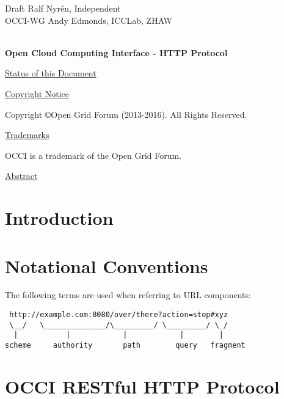 \documentclass[10pt,a4paper]{article}
\begin{document}
\thispagestyle{empty}

Draft \hfill Ralf Nyrén, Independent \\
OCCI-WG \hfill Andy Edmonds, ICCLab, ZHAW \\
\\

\vspace*{0.5in}

\begin{Large}
\textbf{Open Cloud Computing Interface - HTTP Protocol}
\end{Large}

\vspace*{0.5in}

\underline{Status of this Document}



\underline{Copyright Notice}

Copyright \copyright Open Grid Forum (2013-2016). All Rights Reserved.

\underline{Trademarks}

OCCI is a trademark of the Open Grid Forum.

\underline{Abstract}



\newpage
\tableofcontents
\newpage

\section{Introduction}
\label{sec:intro}


\section{Notational Conventions}
\label{sec:not_conv}


The following terms \cite{rfc3986} are used when referring to URL
components:

\begin{verbatim}
 http://example.com:8080/over/there?action=stop#xyz
 \__/   \______________/\_________/ \_________/ \_/
  |           |            |            |        |
scheme     authority       path        query   fragment
\end{verbatim}

\section{OCCI RESTful HTTP Protocol}
\end{document}
